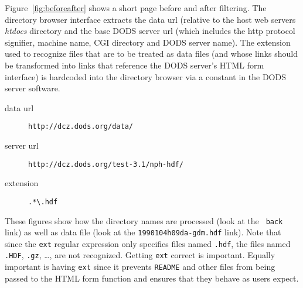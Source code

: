 \documentclass{article}
\begin{document}
Figure~\ref{fig:beforeafter} shows a short page before and after filtering.
The directory browser interface extracts the data url (relative to the host
web servers \emph{htdocs} directory and the base DODS server url (which
includes the http protocol signifier, machine name, CGI directory and DODS
server name). The extension used to recognize files that are to be treated as
data files (and whose links should be transformed into links that reference
the DODS server's HTML form interface) is hardcoded into the directory
browser via a constant in the DODS server software.

\begin{description}

\item [data url] {\tt http://dcz.dods.org/data/}
\item [server url] {\tt http://dcz.dods.org/test-3.1/nph-hdf/}
\item [extension] {\tt \verb+.*\.hdf+}

\end{description}

These figures show how the directory names are processed (look at the {\tt
  back} link) as well as data file (look at the {\tt 1990104h09da-gdm.hdf}
link). Note that since the {\tt ext} regular expression only specifies files
named {\tt *.hdf}, the files named {\tt *.HDF}, {\tt *.gz}, \dots, are not
recognized. Getting {\tt ext} correct is important. Equally important is having
{\tt ext} since it prevents {\tt README} and other files from being passed to
the HTML form function and ensures that they behave as users expect.

\begin{sidewaysfigure}
\begin{scriptsize}
\end{scriptsize}
\caption{The HTML Directory Listing from an Apache WWW Server Before and
  After Processing by  the directory browser function.}
\label{fig:beforeafter}
\end{sidewaysfigure}
\end{document}
